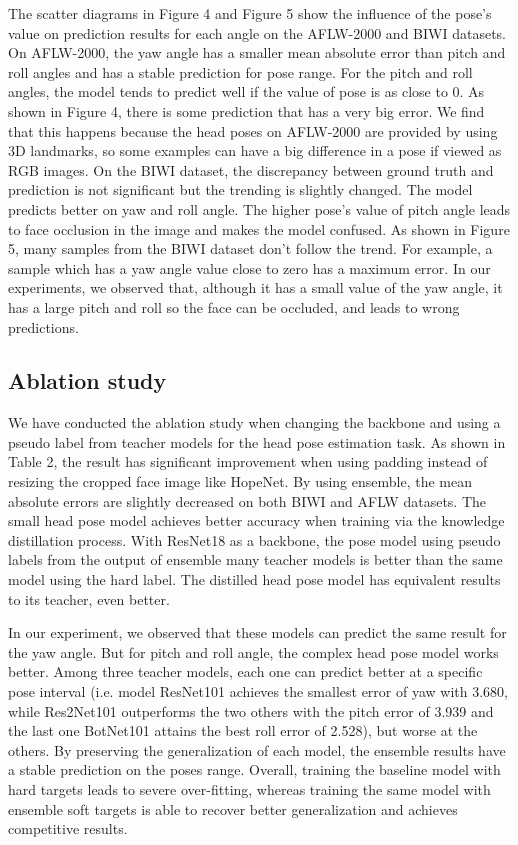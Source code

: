 \documentclass[a4paper,twoside]{article}
\begin{document}
The scatter diagrams in Figure 4 and Figure 5 show the influence of the pose's value on prediction results for each angle on the AFLW-2000 and BIWI datasets. On AFLW-2000, the yaw angle has a smaller mean absolute error than pitch and roll angles and has a stable prediction for pose range. For the pitch and roll angles, the model tends to predict well if the value of pose is as close to 0. As shown in Figure 4, there is some prediction that has a very big error. We find that this happens because the head poses on AFLW-2000 are provided by using 3D landmarks, so some examples can have a big difference in a pose if viewed as RGB images. On the BIWI dataset, the discrepancy between ground truth and prediction is not significant but the trending is slightly changed. The model predicts better on yaw and roll angle. The higher pose's value of pitch angle leads to face occlusion in the image and makes the model confused. As shown in Figure 5, many samples from the BIWI dataset don't follow the trend. For example, a sample which has a yaw angle value close to zero has a maximum error. In our experiments, we observed that, although it has a small value of the yaw angle, it has a large pitch and roll so the face can be occluded, and leads to wrong predictions.

\subsection{Ablation study}

We have conducted the ablation study when changing the backbone and using a pseudo label from teacher models for the head pose estimation task. As shown in Table 2, the result has significant improvement when using padding instead of resizing the cropped face image like HopeNet. By using ensemble, the mean absolute errors are slightly decreased on both BIWI and AFLW datasets. The small head pose model achieves better accuracy when training via the knowledge distillation process. With ResNet18 as a backbone, the pose model using pseudo labels from the output of ensemble many teacher models is better than the same model using the hard label. The distilled head pose model has equivalent results to its teacher, even better. 

In our experiment, we observed that these models can predict the same result for the yaw angle. But for pitch and roll angle, the complex head pose model works better. Among three teacher models, each one can predict better at a specific pose interval (i.e. model ResNet101 achieves the smallest error of yaw with 3.680, while Res2Net101 outperforms the two others with the pitch error of 3.939 and the last one BotNet101 attains the best roll error of 2.528), but worse at the others. By preserving the generalization of each model, the ensemble results have a stable prediction on the poses range. Overall, training the baseline model with hard targets leads to severe over-fitting, whereas training the same model with ensemble soft targets is able to recover better generalization and achieves competitive results.
\end{document}

